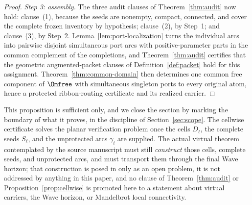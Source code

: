 \begin{proof}
\emph{Step 3: assembly.}
The three audit clauses of Theorem~\ref{thm:audit} now hold: clause~(1), because the
seeds are nonempty, compact, connected, and cover the complete frozen inventory by hypothesis;
clause~(2), by Step~1; and clause~(3), by Step~2. Lemma~\ref{lem:port-localization}
turns the individual arcs into pairwise disjoint simultaneous port arcs with
positive-parameter parts in the common complement of the completions, and
Theorem~\ref{thm:audit} certifies that the geometric augmented-packet clauses of
Definition~\ref{def:packet} hold for this assignment. Theorem~\ref{thm:common-domain}
then determines one common free component of $\Omfree$ with simultaneous singleton
ports to every original atom, hence a protected ribbon-routing certificate
and its realized carrier.
\end{proof}

This proposition is sufficient only, and we close the section by marking the
boundary of what it proves, in the discipline of Section~\ref{sec:scope}. The
cellwise certificate solves the planar verification problem once the cells
$D_\ell$, the complete seeds $S_\ell$, and the unprotected arcs $\gamma_i$ are
supplied. The actual virtual theorem contemplated by the source manuscript must
still \emph{construct} those cells, complete seeds, and unprotected arcs, and must
transport them through the final Wave horizon; that construction is posed in
\cite{MWman} only as an open problem, it is not addressed by anything in this paper,
and no clause of Theorem~\ref{thm:audit} or Proposition~\ref{prop:cellwise} is
promoted here to a statement about virtual carriers, the Wave horizon, or Mandelbrot
local connectivity.
